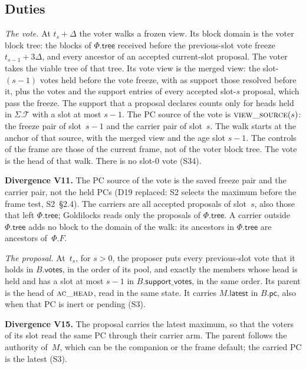 \documentclass{article}
\newcommand{\T}{\mathcal T}
\newcommand{\Fr}{\Phi}
\newcommand{\tree}{\mathsf{tree}}
\newcommand{\pc}{\mathsf{pc}}
\newcommand{\PCdiv}[2]{\par\noindent\textbf{Divergence #1.} #2\par}
\begin{document}
\subsection{Duties}\label{sec:sa-duties}

\emph{The vote.}  At $t_s+\Delta$ the voter walks a frozen view.  Its block
domain is the voter block tree: the blocks of $\Fr.\tree$ received before
the previous-slot vote freeze $t_{s-1}+3\Delta$, and every ancestor of an
accepted current-slot proposal.  The voter takes the viable tree of that
tree.  Its vote view is the merged view: the slot-$(s-1)$ votes held
before the vote freeze, with as support those resolved before it, plus the
votes and the support entries of every accepted slot-$s$ proposal, which
pass the freeze.  The support that a proposal declares counts only for
heads held in $\Sigma.\T$ with a slot at most $s-1$.  The PC source of the
vote is $\Call{view\_source}{}(s)$: the freeze pair of slot~$s-1$ and the
carrier pair of slot~$s$.  The walk starts at the anchor of that source,
with the merged view and the age slot $s-1$.  The controls of the frame
are those of the current frame, not of the voter block tree.  The vote is
the head of that walk.  There is no slot-$0$ vote (S34).

\PCdiv{V11}{The PC source of the vote is the saved freeze pair and the
carrier pair, not the held PCs (D19 replaced: S2 selects the maximum
before the frame test, S2~\S2.4).  The carriers are all accepted
proposals of slot~$s$, also those that left $\Fr.\tree$; Goldilocks reads
only the proposals of $\Fr.\tree$.  A carrier outside $\Fr.\tree$ adds no
block to the domain of the walk: its ancestors in $\Fr.\tree$ are
ancestors of~$\Fr.F$.}

\emph{The proposal.}  At~$t_s$, for $s>0$, the proposer puts every
previous-slot vote that it holds in $B.\mathsf{votes}$, in the order of its
pool, and exactly the members whose head is held and has a slot at most
$s-1$ in $B.\mathsf{support\_votes}$, in the same order.  Its parent is the head of
$\Call{ac\_head}{}$, read in the same state.  It carries $M.\mathsf{latest}$
in $B.\pc$, also when that PC is inert or pending (S3).

\PCdiv{V15}{The proposal carries the latest maximum, so that the voters of
its slot read the same PC through their carrier arm.  The parent follows
the authority of~$M$, which can be the companion or the frame default;
the carried PC is the latest (S3).}
\end{document}
